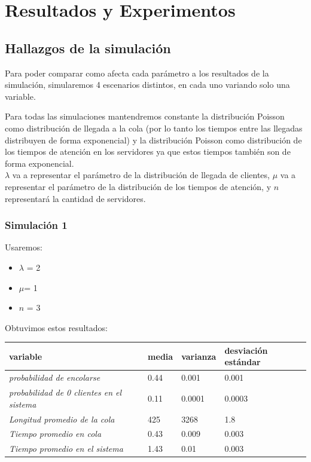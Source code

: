 \documentclass[11pt]{article}
\begin{document}
    \section{Resultados y Experimentos}

    \subsection{Hallazgos de la simulación}

    Para poder comparar como afecta cada parámetro a los resultados de la simulación, simularemos 4 escenarios distintos,
    en cada uno variando solo una variable. 
    
    Para todas las simulaciones mantendremos constante la distribución Poisson como distribución de llegada a la cola (por lo tanto los tiempos entre las llegadas
    distribuyen de forma exponencial) y la distribución Poisson como distribución de los tiempos de atención en los servidores ya que estos tiempos también son de forma exponencial.\\
    $\lambda$ va a representar el parámetro de la distribución de llegada de clientes, $\mu$ va a representar el parámetro
    de la distribución de los tiempos de atención, y $n$ representará la cantidad de servidores.

    
    \subsubsection{Simulación 1}

    Usaremos:
    \begin{itemize}
        \item $\lambda$ = 2
        \item $\mu $= 1
        \item $n$ = 3
    \end{itemize}

    Obtuvimos estos resultados: \\

    \begin{table}[h]
\begin{tabular}{|l|l|l|l|}
\hline
\textbf{variable}                                 & \textbf{media} & \textbf{varianza} & \textbf{desviación estándar} \\ \hline
\textit{probabilidad de encolarse}                & 0.44           & 0.001             & 0.001                         \\ \hline
\textit{probabilidad de 0 clientes en el sistema} & 0.11           & 0.0001            & 0.0003                        \\ \hline
\textit{Longitud promedio de la cola}             & 425            & 3268              & 1.8                           \\ \hline
\textit{Tiempo promedio en cola}                  & 0.43           & 0.009             & 0.003                         \\ \hline
\textit{Tiempo promedio en el sistema}            & 1.43           & 0.01              & 0.003                         \\ \hline
\end{tabular}
\end{table} 
\end{document}
